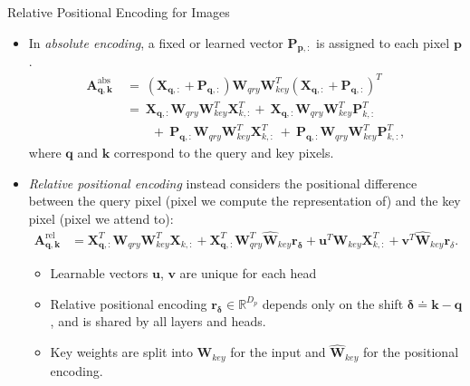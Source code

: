 \documentclass[9pt]{beamer}
\newcommand{\bb}{\mathbb}
\newcommand{\mb}{\bm}
\begin{document}
\newcommand{\WW}{ \mb W_{qry}\mb W_{key}^T }
\begin{frame}{Relative Positional Encoding for Images}
\begin{itemize}
\item In {\em absolute encoding}, a fixed or learned vector $\bm P_{\bm p,:}$ is assigned to each pixel $\bm p$. 
\begin{align}
\mb A^{\text{abs}}_{\mb q, \mb k} 
\ &=\ (\mb X_{\mb q,:} + \mb P_{\mb q,:})\WW(\mb X_{\mb q,:} + \mb P_{\mb q,:})^T \nonumber
\\ &=\ \mb X_{\mb q,:}\WW\mb X^T_{k,:} +\ \mb X_{\mb q,:}\WW\mb P^T_{k,:} 
\\ &\qquad +\ \mb P_{\mb q,:}\WW\mb X^T_{k,:} \ +\ \mb P_{\mb q,:}\WW\mb P^T_{k,:}, \nonumber
\end{align}
where $\bm q$ and $\bm k$ correspond to the query and key pixels.

\item \emph{Relative positional encoding} instead considers the positional difference between the query pixel (pixel we compute the representation of) and the key pixel (pixel we attend to):
\begin{align}
\mb A^\text{rel}_{\mb q, \mb k} &= 
    \mb X_{\mb q,:}^T \WW \mb X_{k,:}
    + \mb X_{\mb q,:}^T \mb W_{qry}^T\hat{\mb W}_{key} \mb r_{\mb \delta}
    + \mb u^T \mb W_{key} \mb X^T_{k,:}
    + \mb v^T \hat{\mb W}_{key} \mb r_{\delta}.
\end{align}
\vspace{-.15in}
\begin{itemize}
    \item Learnable vectors $\bm u$, $\bm v$ are unique for each head 
    \item Relative positional encoding $\bm r_{\bm \delta} \in \bb R^{D_p}$ depends only on the shift $\bm \delta \doteq \bm k -\bm q$, and is shared by all layers and heads.
    \item Key weights are split into $\bm W_{key}$ for the input and $\hat{\bm W}_{key}$ for the positional encoding.
\end{itemize}

\end{itemize}
\end{frame}
\end{document}
